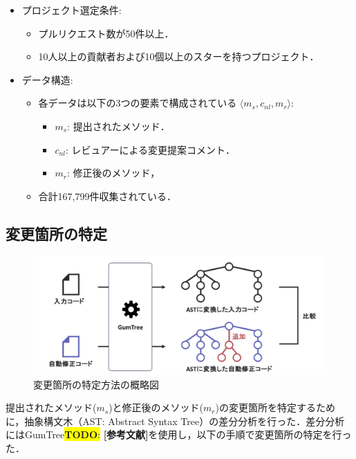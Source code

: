 \documentclass[11pt]{jreport}
\newcommand{\todo}[1]{\colorbox{yellow}{{\bf TODO}:}{\color{red} {\textbf{[#1]}}}}
\begin{document}
\begin{itemize}
    \item プロジェクト選定条件:
    \begin{itemize}
        \item プルリクエスト数が50件以上．
        \item 10人以上の貢献者および10個以上のスターを持つプロジェクト．
    \end{itemize}
    \item データ構造:
    \begin{itemize}
        \item 各データは以下の3つの要素で構成されている $\langle m_s, c_{nl}, m_r \rangle$:
        \begin{itemize}
            \item $m_s$: 提出されたメソッド．
            \item $c_{nl}$: レビュアーによる変更提案コメント．
            \item $m_r$: 修正後のメソッド，
        \end{itemize}
        \item 合計167,799件収集されている．
    \end{itemize}
\end{itemize}

\subsection {変更箇所の特定}

\begin{figure}[ht]
    \centerline{\includegraphics[width=1.0\linewidth]{@BSthesis2024_Akamatsu/Akamatsu_figs/AST.pdf}}
    \caption{変更箇所の特定方法の概略図}
    \label{fig:Insufficient_documentation}
\end{figure}
提出されたメソッド($m_s$)と修正後のメソッド($m_r$)の変更箇所を特定するために，抽象構文木（AST: Abstract Syntax Tree）の差分分析を行った．差分分析にはGumTree\todo{参考文献}を使用し，以下の手順で変更箇所の特定を行った．
\end{document}
